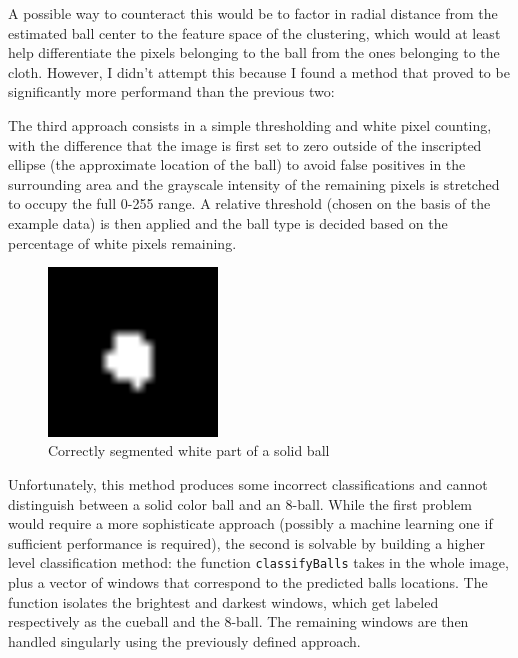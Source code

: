 A possible way to counteract this would be to factor in radial distance 
from the estimated ball center to the feature space of the clustering, 
which would at least help differentiate the pixels belonging to the 
ball from the ones belonging to the cloth. However, I didn't attempt 
this because I found a method that proved to be significantly more 
performand than the previous two:

The third approach consists in a simple thresholding and white pixel 
counting, with the difference that the image is first set to zero 
outside of the inscripted ellipse (the approximate location of the ball)
to avoid false positives in the surrounding area and the grayscale 
intensity of the remaining pixels is stretched to occupy the full 
0-255 range. A relative threshold (chosen on the basis of the example 
data) is then applied and the ball type is decided based on the 
percentage of white pixels remaining.

\begin{figure}[h]
  \centering
  \includegraphics[width=0.4\textwidth]{./imgs/difficult_solid_identified.png}
  \caption{Correctly segmented white part of a solid ball}
\end{figure}

Unfortunately, this method produces some incorrect classifications 
and cannot distinguish between a solid color ball and an 8-ball. 
While the first problem would require a more sophisticate approach 
(possibly a machine learning one if sufficient performance is 
required), the second is solvable by building a higher level 
classification method: the function \verb|classifyBalls| takes 
in the whole image, plus a vector of windows that correspond to 
the predicted balls locations. 
The function isolates the brightest and darkest windows, which 
get labeled respectively as the cueball and the 8-ball. 
The remaining windows are then handled singularly using the previously 
defined approach.